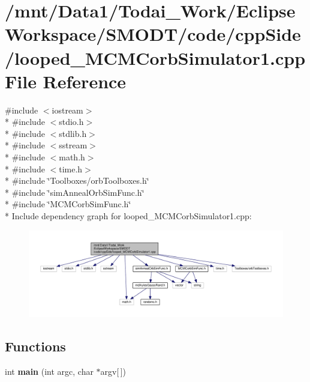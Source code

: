 \section{/mnt/\-Data1/\-Todai\-\_\-\-Work/\-Eclipse\-Workspace/\-S\-M\-O\-D\-T/code/cpp\-Side/looped\-\_\-\-M\-C\-M\-Corb\-Simulator1.cpp File Reference}
\label{looped___m_c_m_corb_simulator1_8cpp}
{\ttfamily \#include $<$iostream$>$}\\*
{\ttfamily \#include $<$stdio.\-h$>$}\\*
{\ttfamily \#include $<$stdlib.\-h$>$}\\*
{\ttfamily \#include $<$sstream$>$}\\*
{\ttfamily \#include $<$math.\-h$>$}\\*
{\ttfamily \#include $<$time.\-h$>$}\\*
{\ttfamily \#include \char`\"{}Toolboxes/orb\-Toolboxes.\-h\char`\"{}}\\*
{\ttfamily \#include \char`\"{}sim\-Anneal\-Orb\-Sim\-Func.\-h\char`\"{}}\\*
{\ttfamily \#include \char`\"{}M\-C\-M\-Corb\-Sim\-Func.\-h\char`\"{}}\\*
Include dependency graph for looped\-\_\-\-M\-C\-M\-Corb\-Simulator1.\-cpp\-:
\nopagebreak
\begin{figure}[H]
\begin{center}
\leavevmode
\includegraphics[width=350pt]{looped___m_c_m_corb_simulator1_8cpp__incl}
\end{center}
\end{figure}
\subsection*{Functions}
\begin{DoxyCompactItemize}
\item 
int {\bf main} (int argc, char $\ast$argv[$\,$])
\end{DoxyCompactItemize}


